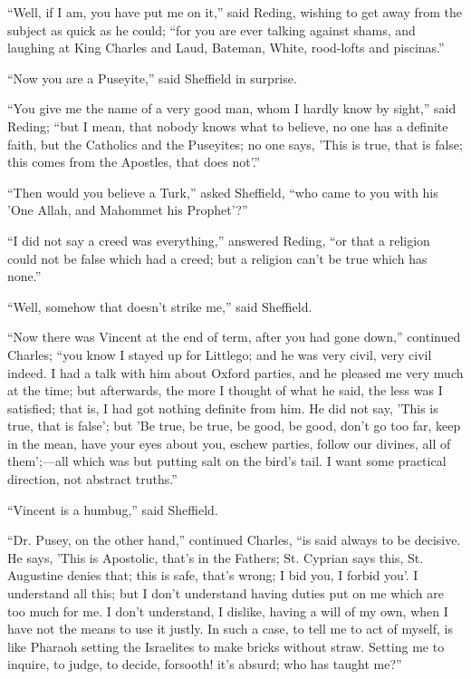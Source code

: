 ``Well, if I am, you have put me on it,'' said Reding,
wishing to get away from the subject as quick as he could;
``for you are ever talking against shams, and laughing at King
Charles and Laud, Bateman, White, rood-lofts and piscinas.''

``Now you are a Puseyite,'' said Sheffield in surprise.

``You give me the name of a very good man, whom I hardly know
by sight,'' said Reding; ``but I mean, that nobody knows what
to believe, no one has a definite faith, but the Catholics and the
Puseyites; no one says, 'This is true, that is false; this comes from
the Apostles, that does not'.''

``Then would you believe a Turk,'' asked Sheffield,
``who came to you with his 'One Allah, and Mahommet his
Prophet'?''

``I did not say a creed was everything,'' answered Reding,
``or that a religion could not be false which had a creed; but a
religion can't be true which has none.''

``Well, somehow that doesn't strike me,'' said Sheffield.

``Now there was Vincent at the end of term, after you had gone
down,'' continued Charles; ``you know I stayed up for Littlego;
and he was very civil, very civil indeed. I had a talk with him about
Oxford parties, and he pleased me very much at the time; but
afterwards, the more I thought of what he said, the less was I
satisfied; that is, I had got nothing definite from him. He did not
say, 'This is true, that is false'; but 'Be true, be true, be good, be
good, don't go too far, keep in the mean, have your eyes about you,
eschew parties, follow our divines, all of them';—all which was but putting salt on the bird's tail. I want some practical
direction, not abstract truths.''

``Vincent is a humbug,'' said Sheffield.

``Dr. Pusey, on the other hand,'' continued Charles,
``is said always to be decisive. He says, 'This is Apostolic, that's
in the Fathers; St. Cyprian says this, St. Augustine denies that; this
is safe, that's wrong; I bid you, I forbid you'. I understand all
this; but I don't understand having duties put on me which are too
much for me. I don't understand, I dislike, having a will of my own,
when I have not the means to use it justly. In such a case, to tell me
to act of myself, is like Pharaoh setting the Israelites to make
bricks without straw. Setting me to inquire, to judge, to decide,
forsooth! it's absurd; who has taught me?''

